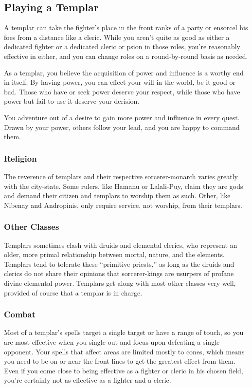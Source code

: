 \subsection{Playing a Templar}
A templar can take the fighter's place in the front ranks of a party or ensorcel his foes from a distance like a cleric. While you aren't quite as good as either a dedicated fighter or a dedicated cleric or psion in those roles, you're reasonably effective in either, and you can change roles on a round-by-round basis as needed.

As a templar, you believe the acquisition of power and influence is a worthy end in itself. By having power, you can effect your will in the world, be it good or bad. Those who have or seek power deserve your respect, while those who have power but fail to use it deserve your derision.

You adventure out of a desire to gain more power and influence in every quest. Drawn by your power, others follow your lead, and you are happy to command them.

\subsubsection{Religion}
The reverence of templars and their respective sorcerer-monarch varies greatly with the city-state. Some rulers, like Hamanu or Lalali-Puy, claim they are gods and demand their citizen and templars to worship them as such. Other, like Nibenay and Andropinis, only require service, not worship, from their templars.

\subsubsection{Other Classes}
Templars sometimes clash with druids and elemental clerics, who represent an older, more primal relationship between mortal, nature, and the elements. Templars tend to tolerate these ``primitive priests,'' as long as the druids and clerics do not share their opinions that sorcerer-kings are usurpers of profane divine elemental power. Templars get along with most other classes very well, provided of course that a templar is in charge.

\subsubsection{Combat}
Most of a templar's spells target a single target or have a range of touch, so you are most effective when you single out and focus upon defeating a single opponent. Your spells that affect areas are limited mostly to cones,
which means you need to be on or near the front lines to get the greatest effect from them. Even if you come close to being effective as a fighter or cleric in his chosen field, you're certainly not as effective as a fighter and a cleric.

